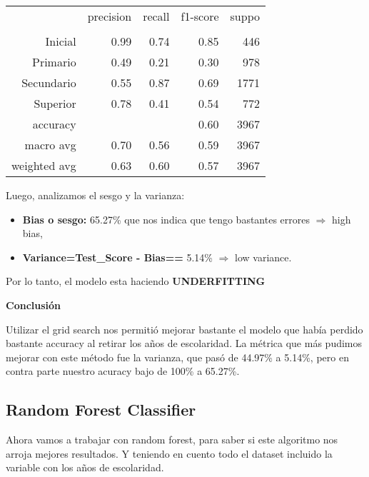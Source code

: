 \documentclass[a4paper]{article}
\begin{document}
            \begin{table}[H]
                \centering
                \begin{tabular}{rrrrr}
                    ~ & precision & recall & f1-score & suppo \\
                    & & & & \\
                    Inicial    & 0.99 & 0.74 & 0.85 & 446 \\
                    Primario   & 0.49 & 0.21 & 0.30 & 978 \\
                    Secundario & 0.55 & 0.87 & 0.69 & 1771 \\
                    Superior   & 0.78 & 0.41 & 0.54 & 772 \\
                    accuracy & & & 0.60 & 3967 \\
                    macro avg & 0.70 & 0.56 & 0.59 & 3967 \\
                    weighted avg & 0.63 & 0.60 & 0.57 & 3967 \\
                \end{tabular}
            \end{table}

            Luego, analizamos el sesgo y la varianza:
            \begin{itemize}
                \item \textbf{Bias o sesgo:} 65.27\% que nos indica que tengo bastantes errores $\Rightarrow$ high bias,
                \item \textbf{Variance=Test\_Score - Bias==} 5.14\%  $\Rightarrow$ low variance.
            \end{itemize}

            Por lo tanto, el modelo esta haciendo \textbf{UNDERFITTING}

            \textbf{Conclusión}
            
            Utilizar el grid search nos permitió mejorar bastante el modelo que había perdido bastante accuracy al retirar los años de escolaridad. La métrica que más pudimos mejorar con este método fue la varianza, que pasó de 44.97\% a 5.14\%, pero en contra parte nuestro acuracy bajo de 100\% a 65.27\%.

    \subsection{Random Forest Classifier}
        
        Ahora vamos a trabajar con random forest, para saber si este algoritmo nos arroja mejores resultados. Y teniendo en cuento todo el dataset incluido la variable con los años de escolaridad. 
\end{document}
